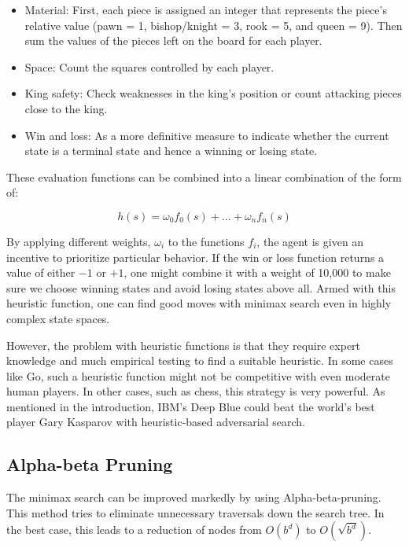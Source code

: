 \begin{itemize}
    \item Material: First, each piece is assigned an integer that represents the piece's relative value (pawn = 1, bishop/knight = 3, rook = 5, and queen = 9). Then sum the values of the pieces left on the board for each player.
    \item Space: Count the squares controlled by each player.
    \item King safety: Check weaknesses in the king's position or count attacking pieces close to the king.
    \item Win and loss: As a more definitive measure to indicate whether the current state is a terminal state and hence a winning or losing state.
\end{itemize}

These evaluation functions can be combined into a linear combination of the form of:

\begin{equation}
    h(s) = \omega_0f_0(s) + ... + \omega_nf_n(s)
\end{equation}

By applying different weights, $ \omega_i $ to the functions $ f_i $, the agent is given an incentive to prioritize particular behavior. If the win or loss function returns a value of either $-1$ or $+1$, one might combine it with a weight of 10,000 to make sure we choose winning states and avoid losing states above all. Armed with this heuristic function, one can find good moves with minimax search even in highly complex state spaces.

However, the problem with heuristic functions is that they require expert knowledge and much empirical testing to find a suitable heuristic. In some cases like Go, such a heuristic function might not be competitive with even moderate human players. In other cases, such as chess, this strategy is very powerful. As mentioned in the introduction, IBM's Deep Blue could beat the world's best player Gary Kasparov with heuristic-based adversarial search.

\subsection{Alpha-beta Pruning}
The minimax search can be improved markedly by using Alpha-beta-pruning. This method tries to eliminate unnecessary traversals down the search tree. In the best case, this leads to a reduction of nodes from $ O(b^d) $ to $ O(\sqrt{b^d}) $.

